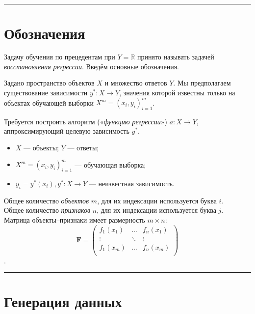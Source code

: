 \documentclass[11pt,a4paper]{article}
\providecommand{\tightlist}{%
      \setlength{\itemsep}{0pt}\setlength{\parskip}{0pt}}
\begin{document}
    \begin{center}\rule{0.5\linewidth}{0.5pt}\end{center}

    \hypertarget{ux43eux431ux43eux437ux43dux430ux447ux435ux43dux438ux44f}{%
\section{Обозначения}\label{ux43eux431ux43eux437ux43dux430ux447ux435ux43dux438ux44f}}

Задачу обучения по прецедентам при \(Y = \mathbb{R}\) принято называть
задачей \emph{восстановления регрессии}. Введём основные обозначения.

Задано пространство объектов \(X\) и множество ответов \(Y\). Мы
предполагаем существование зависимости \(y^*:X \rightarrow Y\), значения
которой известны только на объектах обучающей выборки
\(X^m = (x_i, y_i)_{i=1}^m\).

Требуется построить алгоритм («\emph{функцию регрессии}»)
\(a: X \rightarrow Y\), аппроксимирующий целевую зависимость \(y^*\).

\begin{itemize}
\tightlist
\item
  \(X\) --- объекты; \(Y\) --- ответы;
\item
  \(X^m = (x_i, y_i)_{i=1}^m\) --- обучающая выборка;
\item
  \(y_i = y^*(x_i), y^*:X \rightarrow Y\) --- неизвестная зависимость.
\end{itemize}

Общее количество \emph{объектов} \(m\), для их индексации используется
буква \(i\).\\
Общее количество \emph{признаков} \(n\), для их индексации используется
буква \(j\).\\
Матрица объекты--признаки имеет размерность \(m \times n\): \[
  \mathbf{F} = 
  \begin{pmatrix}
    f_1(x_1) & \ldots & f_n(x_1) \\
    \vdots   & \ddots & \vdots   \\
    f_1(x_m) & \ldots & f_n(x_m) \\
  \end{pmatrix}
\].

    \begin{center}\rule{0.5\linewidth}{0.5pt}\end{center}

    \hypertarget{ux433ux435ux43dux435ux440ux430ux446ux438ux44f-ux434ux430ux43dux43dux44bux445}{%
\section{Генерация
данных}\label{ux433ux435ux43dux435ux440ux430ux446ux438ux44f-ux434ux430ux43dux43dux44bux445}}
\end{document}
